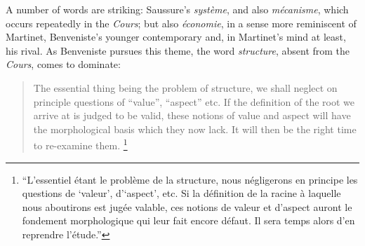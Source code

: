 \documentclass[output=paper]{langscibook}
\begin{document}
A number of words are striking: Saussure's \emph{système}, and also \emph{mécanisme}, which occurs repeatedly in the \emph{Cours}; but also \emph{économie}, in a sense more reminiscent of Martinet, Benveniste's younger contemporary and, in Martinet's mind at least, his rival. As Benveniste pursues this theme, the word \emph{structure}, absent from the \emph{Cours}, comes to dominate:

\begin{quotation}
The essential thing being the problem of structure, we shall neglect on principle questions of ``value'', ``aspect'' etc. If the definition of the root we arrive at is judged to be valid, these notions of value and aspect will have the morphological basis which they now lack. It will then be the right time to re-examine them. \citep[147--148]{Benveniste1935}\footnote{``L'essentiel étant le problème de la structure, nous négligerons en principe les questions de `valeur', d'`aspect', etc. Si la définition de la racine à laquelle nous aboutirons est jugée valable, ces notions de valeur et d’aspect auront le fondement morphologique qui leur fait encore défaut. Il sera temps alors d’en reprendre l'étude.''}
\end{quotation}
\end{document}
